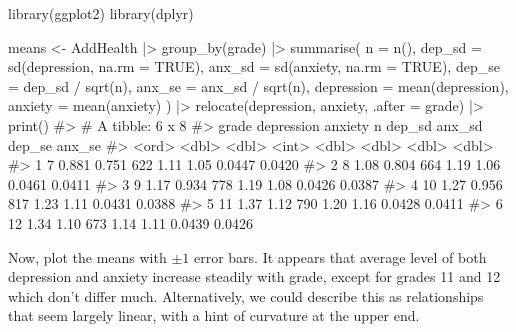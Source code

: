 \documentclass[
  letterpaper,
  10pt,
  krantz2]{krantz}
\makeatletter
\newenvironment{Shaded}{\begin{snugshade}}{\end{snugshade}}
\newcommand{\AttributeTok}[1]{\textcolor[rgb]{0.40,0.45,0.13}{#1}}
\newcommand{\CommentTok}[1]{\textcolor[rgb]{0.37,0.37,0.37}{#1}}
\newcommand{\ConstantTok}[1]{\textcolor[rgb]{0.56,0.35,0.01}{#1}}
\newcommand{\FunctionTok}[1]{\textcolor[rgb]{0.28,0.35,0.67}{#1}}
\newcommand{\NormalTok}[1]{\textcolor[rgb]{0.00,0.23,0.31}{#1}}
\newcommand{\OtherTok}[1]{\textcolor[rgb]{0.00,0.23,0.31}{#1}}
\newcommand{\SpecialCharTok}[1]{\textcolor[rgb]{0.37,0.37,0.37}{#1}}
\newenvironment{kframe}{%
  \medskip{}
  \setlength{\fboxsep}{.8em}
  \def\at@end@of@kframe{}%
  \ifinner\ifhmode%
  \def\at@end@of@kframe{\end{minipage}}%
  \begin{minipage}{\columnwidth}%
  \fi\fi%
  \def\FrameCommand##1{\hskip\@totalleftmargin \hskip-\fboxsep
  \colorbox{shadecolor}{##1}\hskip-\fboxsep
      \hskip-\linewidth \hskip-\@totalleftmargin \hskip\columnwidth}%
  \MakeFramed {\advance\hsize-\width
    \@totalleftmargin\z@ \linewidth\hsize
    \@setminipage}}%
{\par\unskip\endMakeFramed%
  \at@end@of@kframe}
\renewenvironment{Shaded}{\begin{kframe}}{\end{kframe}}
\makeatother
\begin{document}
\begin{Shaded}
\begin{Highlighting}[]
\FunctionTok{library}\NormalTok{(ggplot2)}
\FunctionTok{library}\NormalTok{(dplyr)}

\NormalTok{means }\OtherTok{\textless{}{-}}\NormalTok{ AddHealth }\SpecialCharTok{|\textgreater{}}
  \FunctionTok{group\_by}\NormalTok{(grade) }\SpecialCharTok{|\textgreater{}}
  \FunctionTok{summarise}\NormalTok{(}
    \AttributeTok{n =} \FunctionTok{n}\NormalTok{(),}
    \AttributeTok{dep\_sd =} \FunctionTok{sd}\NormalTok{(depression, }\AttributeTok{na.rm =} \ConstantTok{TRUE}\NormalTok{),}
    \AttributeTok{anx\_sd =} \FunctionTok{sd}\NormalTok{(anxiety, }\AttributeTok{na.rm =} \ConstantTok{TRUE}\NormalTok{),}
    \AttributeTok{dep\_se =}\NormalTok{ dep\_sd }\SpecialCharTok{/} \FunctionTok{sqrt}\NormalTok{(n),}
    \AttributeTok{anx\_se =}\NormalTok{ anx\_sd }\SpecialCharTok{/} \FunctionTok{sqrt}\NormalTok{(n),}
    \AttributeTok{depression =} \FunctionTok{mean}\NormalTok{(depression),}
    \AttributeTok{anxiety =} \FunctionTok{mean}\NormalTok{(anxiety) ) }\SpecialCharTok{|\textgreater{}} 
  \FunctionTok{relocate}\NormalTok{(depression, anxiety, }\AttributeTok{.after =}\NormalTok{ grade) }\SpecialCharTok{|\textgreater{}}
  \FunctionTok{print}\NormalTok{()}
\CommentTok{\#\textgreater{} \# A tibble: 6 x 8}
\CommentTok{\#\textgreater{}   grade depression anxiety     n dep\_sd anx\_sd dep\_se anx\_se}
\CommentTok{\#\textgreater{}   \textless{}ord\textgreater{}      \textless{}dbl\textgreater{}   \textless{}dbl\textgreater{} \textless{}int\textgreater{}  \textless{}dbl\textgreater{}  \textless{}dbl\textgreater{}  \textless{}dbl\textgreater{}  \textless{}dbl\textgreater{}}
\CommentTok{\#\textgreater{} 1 7          0.881   0.751   622   1.11   1.05 0.0447 0.0420}
\CommentTok{\#\textgreater{} 2 8          1.08    0.804   664   1.19   1.06 0.0461 0.0411}
\CommentTok{\#\textgreater{} 3 9          1.17    0.934   778   1.19   1.08 0.0426 0.0387}
\CommentTok{\#\textgreater{} 4 10         1.27    0.956   817   1.23   1.11 0.0431 0.0388}
\CommentTok{\#\textgreater{} 5 11         1.37    1.12    790   1.20   1.16 0.0428 0.0411}
\CommentTok{\#\textgreater{} 6 12         1.34    1.10    673   1.14   1.11 0.0439 0.0426}
\end{Highlighting}
\end{Shaded}

Now, plot the means with \(\pm 1\) error bars. It appears that average
level of both depression and anxiety increase steadily with grade,
except for grades 11 and 12 which don't differ much. Alternatively, we
could describe this as relationships that seem largely linear, with a
hint of curvature at the upper end.
\end{document}
